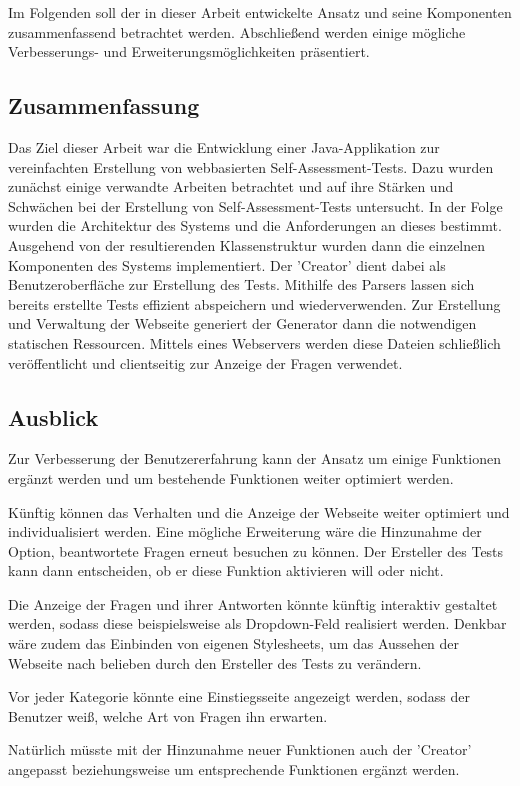 \label{Zusammenfassung_Ausblick} 

Im Folgenden soll der in dieser Arbeit entwickelte Ansatz und seine Komponenten zusammenfassend betrachtet werden. Abschließend werden einige mögliche Verbesserungs- und Erweiterungsmöglichkeiten präsentiert.

\subsection{Zusammenfassung}

Das Ziel dieser Arbeit war die Entwicklung einer Java-Applikation zur vereinfachten Erstellung von webbasierten Self-Assessment-Tests. Dazu wurden zunächst einige verwandte Arbeiten betrachtet und auf ihre Stärken und Schwächen bei der Erstellung von Self-Assessment-Tests untersucht. In der Folge wurden die Architektur des Systems und die Anforderungen an dieses bestimmt. Ausgehend von der resultierenden Klassenstruktur wurden dann die einzelnen Komponenten des Systems implementiert. Der 'Creator' dient dabei als Benutzeroberfläche zur Erstellung des Tests. Mithilfe des Parsers lassen sich bereits erstellte Tests effizient abspeichern und wiederverwenden. Zur Erstellung und Verwaltung der Webseite generiert der Generator dann die notwendigen statischen Ressourcen. Mittels eines Webservers werden diese Dateien schließlich veröffentlicht und clientseitig zur Anzeige der Fragen verwendet.

\subsection{Ausblick}

Zur Verbesserung der Benutzererfahrung kann der Ansatz um einige Funktionen ergänzt werden und um bestehende Funktionen weiter optimiert werden. 

Künftig können das Verhalten und die Anzeige der Webseite weiter optimiert und individualisiert werden.  
Eine mögliche Erweiterung wäre die Hinzunahme der Option, beantwortete Fragen erneut besuchen zu können. Der Ersteller des Tests kann dann entscheiden, ob er diese Funktion aktivieren will oder nicht.

Die Anzeige der Fragen und ihrer Antworten könnte künftig interaktiv gestaltet werden, sodass diese beispielsweise als Dropdown-Feld realisiert werden. Denkbar wäre zudem das Einbinden von eigenen Stylesheets, um das Aussehen der Webseite nach belieben durch den Ersteller des Tests zu verändern.

Vor jeder Kategorie könnte eine Einstiegsseite angezeigt werden, sodass der Benutzer weiß, welche Art von Fragen ihn erwarten. 

Natürlich müsste mit der Hinzunahme neuer Funktionen auch der 'Creator' angepasst beziehungsweise um entsprechende Funktionen ergänzt werden.